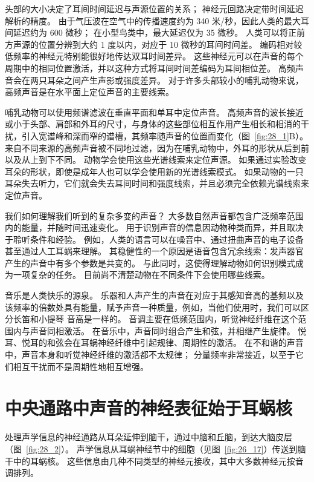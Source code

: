 头部的大小决定了耳间时间延迟与声源位置的关系； 神经元回路决定带时间延迟解析的精度。
由于气压波在空气中的传播速度约为 340 米/秒，因此人类的最大耳间延迟约为 600 微秒；
在小型鸟类中，最大延迟仅为 35 微秒。
人类可以将正前方声源的位置分辨到大约 1 度以内，对应于 10 微秒的耳间时间差。
编码相对较低频率的神经元特别能很好地传达双耳时间差异。
这些神经元可以在声音的每个周期中的相同位置激活，并以这种方式将耳间时间差编码为耳间相位差。
高频声音会在两只耳朵之间产生声影或强度差异。
对于许多头部较小的哺乳动物来说，高频声音是在水平面上定位声音的主要线索。


哺乳动物可以使用频谱滤波在垂直平面和单耳中定位声音。
高频声音的波长接近或小于头部、肩部和外耳的尺寸，与身体的这些部位相互作用产生相长和相消的干扰，引入宽谱峰和深而窄的谱槽，其频率随声音的位置而变化（图~\ref{fig:28_1}B）。
来自不同来源的高频声音被不同地过滤，因为在哺乳动物中，外耳的形状从后到前以及从上到下不同。
动物学会使用这些光谱线索来定位声源。
如果通过实验改变耳朵的形状，即使是成年人也可以学会使用新的光谱线索模式。
如果动物的一只耳朵失去听力，它们就会失去耳间时间和强度线索，并且必须完全依赖光谱线索来定位声音。


我们如何理解我们听到的复杂多变的声音？
大多数自然声音都包含广泛频率范围内的能量，并随时间迅速变化。
用于识别声音的信息因动物种类而异，并且取决于聆听条件和经验。
例如，人类的语言可以在噪音中、通过扭曲声音的电子设备甚至通过人工耳蜗来理解。
其稳健性的一个原因是语音包含冗余线索：发声器官产生的声音中有多个参数是共变的。
与此同时，这使得理解动物如何识别模式成为一项复杂的任务。
目前尚不清楚动物在不同条件下会使用哪些线索。


音乐是人类快乐的源泉。
乐器和人声产生的声音在对应于其感知音高的基频以及该频率的倍数处具有能量，赋予声音一种质量，例如，当他们使用时，我们可以区分长笛和小提琴 音高是一样的。
音调主要在低频范围内，听觉神经纤维在这个范围内与声音同相激活。
在音乐中，声音同时组合产生和弦，并相继产生旋律。
悦耳、悦耳的和弦会在耳蜗神经纤维中引起规律、周期性的激活。
在不和谐的声音中，声音本身和听觉神经纤维的激活都不太规律；
分量频率非常接近，以至于它们相互干扰而不是周期性地相互增强。



\section{中央通路中声音的神经表征始于耳蜗核}

处理声学信息的神经通路从耳朵延伸到脑干，通过中脑和丘脑，到达大脑皮层（图~\ref{fig:28_2}）。
声学信息从耳蜗神经节中的细胞（见图~\ref{fig:26_17}）传送到脑干中的耳蜗核。
这些信息由几种不同类型的神经元接收，其中大多数神经元按音调排列。


